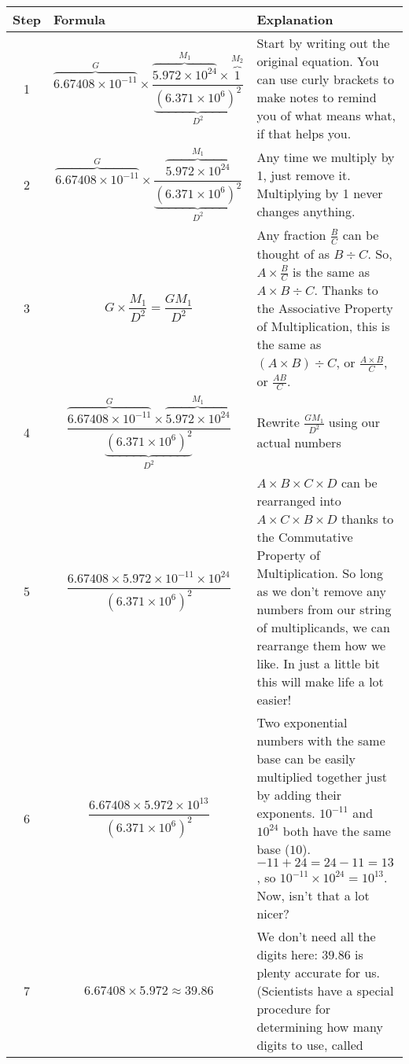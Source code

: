 \documentclass[10pt,letterpaper]{report}
\begin{document}
\begin{longtable}{| c | p{} | p{} |}
  \hline
  Step & Formula & Explanation \\
  \hline \hline
  1 & \[ \overbrace{6.67408 \times 10^{-11}}^G \times
    \frac{\overbrace{5.972 \times 10^{24}}^{M_1}\times
      \overbrace{1}^{M_2}}{\underbrace{(6.371 \times
        10^6)^2}_{D^2}} \] & Start by writing out the
  original equation.  You can use curly brackets to make notes to
  remind you of what means what, if that helps you. \\
  \hline
  2 & \[ \overbrace{6.67408 \times 10^{-11}}^G \times
  \frac{\overbrace{5.972 \times 10^{24}}^{M_1}}{\underbrace{(6.371
      \times 10^6)^2}_{D^2}} \] & Any time we multiply by 1, just remove it.
  Multiplying by 1 never changes anything. \\
  \hline
  3 & \[
    G \times \frac{M_1}{D^2} = \frac{GM_1}{D^2} \]
  & Any fraction
  $\frac{B}{C}$ can be thought of as $B \div C$.  So, 
  $A \times \frac{B}{C}$ is the same as $A \times B \div C$.
  Thanks to the Associative Property of Multiplication, this is the same as
  $(A \times B) \div C$, or $\frac{A \times B}{C}$, or $\frac{AB}{C}$.\\
  \hline
 4 & \[ \frac{\overbrace{6.67408 \times 10^{-11}}^{G}\times\overbrace{5.972
     \times 10^{24}}^{M_{1}}}{\underbrace{(6.371 \times
     10^6)^2}_{D^2}}\] & Rewrite $\frac{GM_1}{D^2}$ using our actual
 numbers \\
 \hline
  5 & \[ \frac{6.67408 \times 5.972 \times 10^{-11} \times
    10^{24}}{(6.371 \times 10^6)^2} \] & $ A \times B \times C \times D$
  can be rearranged into $A \times C \times B \times D$ thanks to the
  Commutative Property of Multiplication.  So long as we don't remove
  any numbers from our string of multiplicands, we can rearrange them
  how we like.  In just a little bit this will make life a lot easier!
  \\
  \hline
  6 & \[ \frac{6.67408 \times 5.972 \times 10^{13}}{(6.371\times10^6)^2}\] &
  Two exponential numbers with the same base can be
  easily multiplied together just by adding their exponents.
  $10^{-11}$ and $10^{24}$ both have the same base ($10$).
  $-11 + 24 = 24 - 11 = 13$, so $10^{-11} \times 10^{24} = 10^{13}$.
  Now, isn't that a lot nicer? \\
  \hline
  7 & \[ 6.67408 \times 5.972 \approx 39.86 \] & We don't need all the
  digits here: $39.86$ is plenty accurate for us.  (Scientists have a
  special procedure for determining how many digits to use, called

\end{longtable}
\end{document}
